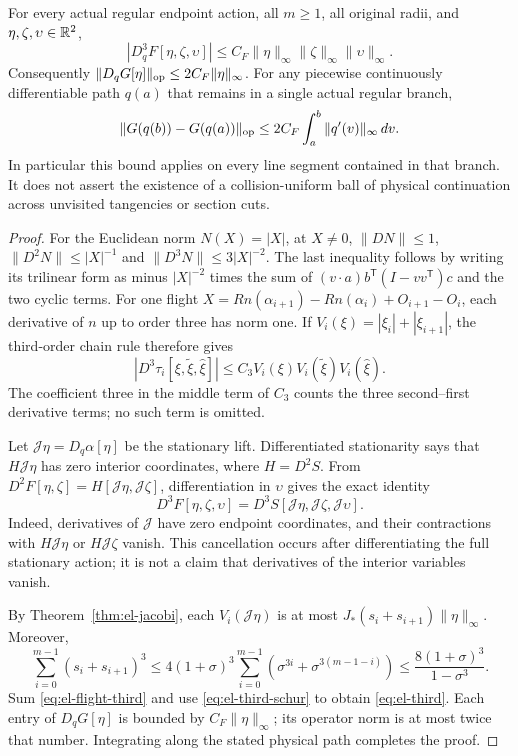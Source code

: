 \begin{theorem}
\label{thm:el-third}
For every actual regular endpoint action, all $m\geq1$, all original
radii, and $\eta,\zeta,\upsilon\in\mathbb R^2$,
\begin{equation}\label{eq:el-third}
 |D_q^3F[\eta,\zeta,\upsilon]|
 \leq C_F\|\eta\|_\infty\|\zeta\|_\infty\|\upsilon\|_\infty.
\end{equation}
Consequently $\|D_qG[\eta]\|_{\rm op}\leq2C_F\|\eta\|_\infty$.
For any piecewise continuously differentiable path $q(a)$ that remains
in a single actual regular branch,
\[
 \|G(q(b))-G(q(a))\|_{\rm op}
 \leq2C_F\int_a^b\|q'(v)\|_\infty\,dv.
\]
In particular this bound applies on every line segment contained in
that branch. It does not assert the existence of a collision-uniform
ball of physical continuation across unvisited tangencies or section cuts.
\end{theorem}
\begin{proof}
For the Euclidean norm $N(X)=|X|$, at $X\ne0$,
$\|DN\|\leq1$, $\|D^2N\|\leq|X|^{-1}$ and
$\|D^3N\|\leq3|X|^{-2}$. The last inequality follows by writing its
trilinear form as minus $|X|^{-2}$ times the sum of
$(v\cdot a)b^{\mathsf T}(I-vv^{\mathsf T})c$ and the two cyclic terms.
For one flight $X=R n(\alpha_{i+1})-R n(\alpha_i)+O_{i+1}-O_i$,
each derivative of $n$ up to order three has norm one. If
$V_i(\xi)=|\xi_i|+|\xi_{i+1}|$, the third-order chain rule therefore gives
\begin{equation}\label{eq:el-flight-third}
 |D^3\tau_i[\xi,\widetilde\xi,\widehat\xi]|
 \leq C_3 V_i(\xi)V_i(\widetilde\xi)V_i(\widehat\xi).
\end{equation}
The coefficient three in the middle term of $C_3$ counts the three
second--first derivative terms; no such term is omitted.

Let $\mathcal J\eta=D_q\alpha[\eta]$ be the stationary lift.
Differentiated stationarity says that $H\mathcal J\eta$ has zero
interior coordinates, where $H=D^2S$. From
$D^2F[\eta,\zeta]=H[\mathcal J\eta,\mathcal J\zeta]$, differentiation in
$\upsilon$ gives the exact identity
\begin{equation}\label{eq:el-third-schur}
 D^3F[\eta,\zeta,\upsilon]
 =D^3S[\mathcal J\eta,\mathcal J\zeta,\mathcal J\upsilon].
\end{equation}
Indeed, derivatives of $\mathcal J$ have zero endpoint coordinates,
and their contractions with $H\mathcal J\eta$ or
$H\mathcal J\zeta$ vanish. This cancellation occurs after differentiating
the full stationary action; it is not a claim that derivatives of the
interior variables vanish.

By Theorem~\ref{thm:el-jacobi}, each $V_i(\mathcal J\eta)$ is at most
$J_*(s_i+s_{i+1})\|\eta\|_\infty$. Moreover,
\[
 \sum_{i=0}^{m-1}(s_i+s_{i+1})^3
 \leq4(1+\sigma)^3\sum_{i=0}^{m-1}
       (\sigma^{3i}+\sigma^{3(m-1-i)})
 \leq\frac{8(1+\sigma)^3}{1-\sigma^3}.
\]
Sum \eqref{eq:el-flight-third} and use \eqref{eq:el-third-schur} to
obtain \eqref{eq:el-third}. Each entry of $D_qG[\eta]$ is bounded by
$C_F\|\eta\|_\infty$; its operator norm is at most twice that number.
Integrating along the stated physical path completes the proof.
\end{proof}


